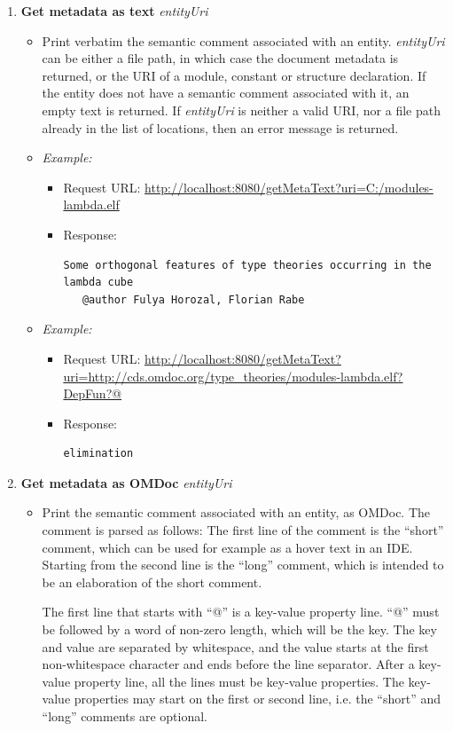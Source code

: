 \begin{enumerate}
\item \textbf{Get metadata as text} \qquad  {}\textit{entityUri}
	\begin{itemize}
	\item Print verbatim the semantic comment associated with an entity. \textit{entityUri} can be either a file path, in which case the document metadata is returned, or the URI of a module, constant or structure declaration. If the entity does not have a semantic comment associated with it, an empty text is returned. If \textit{entityUri} is neither a valid URI, nor a file path already in the list of locations, then an error message is returned.
	\item \textit{Example:} 
		\begin{itemize}
		\item Request URL:  \url{http://localhost:8080/getMetaText?uri=C:/modules-lambda.elf}
		\item Response: 
		\begin{verbatim}Some orthogonal features of type theories occurring in the lambda cube
   @author Fulya Horozal, Florian Rabe\end{verbatim}
		\end{itemize}
	\item \textit{Example:} 
		\begin{itemize}
		\item Request URL:  \url{http://localhost:8080/getMetaText?uri=http://cds.omdoc.org/type\_theories/modules-lambda.elf?DepFun?@}
		\item Response: 
		\begin{verbatim}elimination\end{verbatim}
		\end{itemize}
	\end{itemize}


\item \textbf{Get metadata as OMDoc} \qquad  {}\textit{entityUri}
	\begin{itemize}
	\item Print the semantic comment associated with an entity, as OMDoc. The comment is parsed as follows: The first line of the comment is the ``short'' comment, which can be used for example as a hover text in an IDE. Starting from the second line is the ``long'' comment, which is intended to be an elaboration of the short comment. 

The first line that starts with ``@'' is a key-value property line. ``@'' must be followed by a word of non-zero length, which will be the key. The key and value are separated by whitespace, and the value starts at the first non-whitespace character and ends before the line separator. After a key-value property line, all the lines must be key-value properties. The key-value properties may start on the first or second line, i.e. the ``short'' and ``long'' comments are optional.


\end{itemize}
\end{enumerate}
